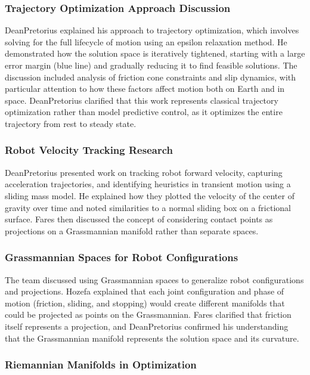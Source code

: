 \subsubsection{Trajectory Optimization Approach Discussion}

DeanPretorius explained his approach to trajectory optimization, which involves solving for the full lifecycle of motion using an epsilon relaxation method. He demonstrated how the solution space is iteratively tightened, starting with a large error margin (blue line) and gradually reducing it to find feasible solutions. The discussion included analysis of friction cone constraints and slip dynamics, with particular attention to how these factors affect motion both on Earth and in space. DeanPretorius clarified that this work represents classical trajectory optimization rather than model predictive control, as it optimizes the entire trajectory from rest to steady state.

\subsubsection{Robot Velocity Tracking Research}

DeanPretorius presented work on tracking robot forward velocity, capturing acceleration trajectories, and identifying heuristics in transient motion using a sliding mass model. He explained how they plotted the velocity of the center of gravity over time and noted similarities to a normal sliding box on a frictional surface. Fares then discussed the concept of considering contact points as projections on a Grassmannian manifold rather than separate spaces.

\subsubsection{Grassmannian Spaces for Robot Configurations}

The team discussed using Grassmannian spaces to generalize robot configurations and projections. Hozefa explained that each joint configuration and phase of motion (friction, sliding, and stopping) would create different manifolds that could be projected as points on the Grassmannian. Fares clarified that friction itself represents a projection, and DeanPretorius confirmed his understanding that the Grassmannian manifold represents the solution space and its curvature.

\subsubsection{Riemannian Manifolds in Optimization}

